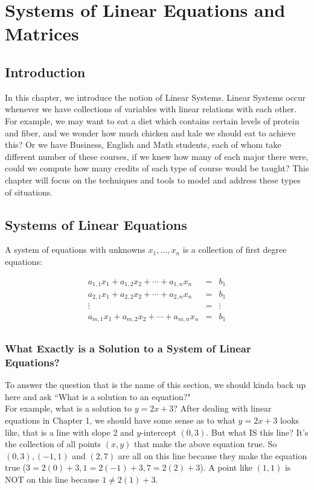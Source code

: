 \chapter{Systems of Linear Equations and Matrices}


\section*{Introduction}

In this chapter, we introduce the notion of Linear Systems.  Linear Systems occur whenever we have collections of variables with linear relations with each other.  For example, we may want to eat a diet which contains certain levels of protein and fiber, and we wonder how much chicken and kale we should eat to achieve this?  Or we have Business, English and Math students, each of whom take different number of these courses, if we knew how many of each major there were, could we compute how many credits of each type of course would be taught?  This chapter will focus on the techniques and tools to model and address these types of situations.



\section{Systems of Linear  Equations}

A system of equations with unknowns $x_1,\ldots,x_n$ is a collection of first degree equations:

\begin{eqnarray*}
a_{1,1}x_1+a_{1,2}x_2+\cdots+a_{1,n}x_n&=&b_1\\
a_{2,1}x_1+a_{2,2}x_2+\cdots+a_{2,n}x_n&=&b_1\\
\vdots &=&\vdots\\
a_{m,1}x_1+a_{m,2}x_2+\cdots+a_{m,n}x_n&=&b_1\\
\end{eqnarray*}



\subsection{What Exactly is  a Solution to a System of Linear Equations?}

To answer the question that is the name of this section, we should kinda back up here and ask ``What is a solution to an equation?"\\

For example, what is a solution to $y=2x+3$? After dealing with linear equations in Chapter 1, we should have some sense as to what $y=2x+3$ looks like, that is a line with slope 2 and $y$-intercept $(0,3)$.  But what IS this line?  It's the collection of all points $(x,y)$ that make the above equation true.  So $(0,3), (-1,1)$ and $(2,7)$ are all on this line because they make the equation true ($3=2(0)+3, 1=2(-1)+3, 7=2(2)+3$).  A point like $(1,1)$ is NOT on this line because $1\neq 2(1)+3$.  \\

